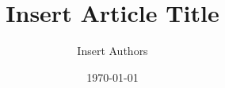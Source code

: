 \begin{titlepage}
    \title{Insert Article Title}
    \author{Insert Authors}
    \date{\today} 
    \maketitle

    \begin{abstract}
        \lipsum[1]
    \end{abstract}

    \tableofcontents
\end{titlepage}
